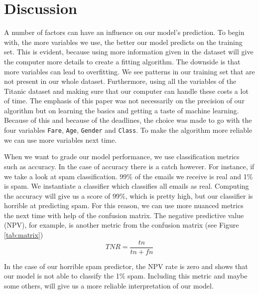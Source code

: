 \documentclass[11pt]{article}
\begin{document}
\newpage
\section{Discussion}
\label{sec:orga7e0343}
\label{sec:discussion}

A number of factors can have an influence on our model's prediction. To begin with, the more variables we use, the better  our model predicts on the training set. This is evident, because using more information given in the dataset will give the computer more details to create a fitting algorithm. The downside is that more variables can lead to overfitting. We see patterns in our training set that are not present in our whole dataset. Furthermore, using all the variables of the Titanic dataset and making sure that our computer can handle these costs a lot of time. The emphasis of this paper was not necessarily on the precision of our algorithm but on learning the basics and getting a taste of machine learning. Because of this and because of the deadlines, the choice was made to go with the four variables \texttt{Fare}, \texttt{Age}, \texttt{Gender} and \texttt{Class}. To make the algorithm more reliable we can use more variables next time.  

When we want to grade our model performance, we use classification metrics such as accuracy. In the case of accuracy there is a catch however. For instance, if we take a look at spam classification. 99\% of the emails we receive is real and 1\% is spam. We instantiate a classifier which classifies all emails as real. Computing the accuracy will give us a score of 99\%, which is pretty high, but our classifier is horrible at predicting spam. For this reason, we can use more nuanced metrics the next time with  help of the confusion matrix. The negative predictive value (NPV), for example, is another metric from the confusion matrix (see Figure \ref{tab:matrix})
\begin{equation}
TNR = \frac{tn}{tn+fn}
\end{equation} 

In the case of our horrible spam predictor, the NPV rate is zero and shows that our model is not able to classify the 1\% spam. Including this metric and maybe some others, will give us a more reliable interpretation of our model. 
\end{document}
